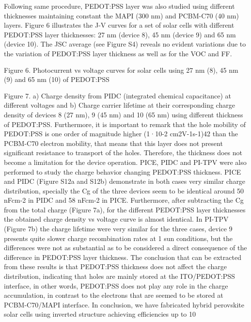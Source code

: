 Following same procedure, PEDOT:PSS layer was also studied using different thicknesses maintaining constant the MAPI (300 nm) and PCBM-C70 (40 nm) layers.
Figure 6 illustrates the J-V curves for a set of solar cells with different PEDOT:PSS layer thicknesses: 27 nm (device 8), 45 nm (device 9) and 65 nm (device 10). The JSC average (see Figure S4) reveals no evident variations due to the variation of PEDOT:PSS layer thickness as well as for the VOC and FF.

Figure 6. Photocurrent vs voltage curves for solar cells using 27 nm (8), 45 nm (9) and 65 nm (10) of PEDOT:PSS 


Figure 7. a) Charge density from PIDC (integrated chemical capacitance) at different voltages and b) Charge carrier lifetime at their corresponding charge density of devices 8 (27 nm), 9 (45 nm) and 10 (65 nm) using different thickness of PEDOT:PSS.
Furthermore, it is important to remark that the hole mobility of PEDOT:PSS is one order of magnitude higher (1·10-2 cm2V-1s-1)42 than the PCBM-C70 electron mobility, that means that this layer does not present significant resistance to transport of the holes. 
Therefore, the thickness does not become a limitation for the device operation. PICE, PIDC and PI-TPV were also performed to study the charge behavior changing PEDOT:PSS thickness. PICE and PIDC (Figure S12a and S12b) demonstrate in both cases very similar charge distribution, specially the Cg of the three devices seem to be identical around 50 nFcm-2 in PIDC and 58 nFcm-2 in PICE.
Furthermore, after subtracting the Cg from the total charge (Figure 7a), for the different PEDOT:PSS layer thicknesses the obtained charge density vs voltage curve is almost identical. In PI-TPV (Figure 7b) the charge lifetime were very similar for the three cases, device 9 presents quite slower charge recombination rates at 1 sun conditions, but the differences were not as substantial as to be considered a direct consequence of the difference in PEDOT:PSS layer thickness. The conclusion that can be extracted from these results is that PEDOT:PSS thickness does not affect the charge distribution, indicating that holes are mainly stored at the ITO/PEDOT:PSS interface, in other words, PEDOT:PSS does not play any role in the charge accumulation, in contrast to the electrons that are seemed to be stored at PCBM-C70/MAPI interface.
In conclusion, we have fabricated hybrid perovskite solar cells using inverted structure achieving efficiencies up to 10 %

